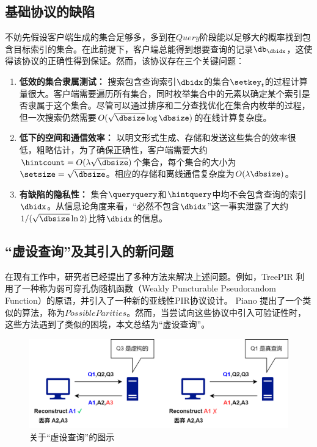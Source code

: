 \subsection{基础协议的缺陷}
不妨先假设客户端生成的集合足够多，多到在$Query$阶段能以足够大的概率找到包含目标索引的集合。在此前提下，客户端总能得到想要查询的记录$\db_\dbidx$，这使得该协议的正确性得到保证。然而，该协议存在三个关键问题：

\begin{enumerate}
\item \textbf{低效的集合隶属测试：} 搜索包含查询索引$\dbidx$的集合$\setkey_t$的过程计算量很大。客户端需要遍历所有集合，同时枚举集合中的元素以确定某个索引是否隶属于这个集合。尽管可以通过排序和二分查找优化在集合内枚举的过程，但一次搜索仍然需要$O(\sqrt{\dbsize}\log \dbsize)$的在线计算复杂度。
\item \textbf{低下的空间和通信效率：} 以明文形式生成、存储和发送这些集合的效率很低，粗略估计，为了确保正确性，客户端需要大约$\hintcount = O(\lambda\sqrt{\dbsize})$个集合，每个集合的大小为$\setsize = \sqrt{\dbsize}$。相应的存储和离线通信复杂度为$O(\lambda\dbsize)$。
\item \textbf{有缺陷的隐私性：} 集合$\queryquery$和$\hintquery$中均不会包含查询的索引$\dbidx$。从信息论角度来看，“必然不包含$\dbidx$”这一事实泄露了大约$1/(\sqrt{\dbsize}\ln 2)$比特$\dbidx$的信息。
\end{enumerate}

\subsection{“虚设查询”及其引入的新问题}
在现有工作中，研究者已经提出了多种方法来解决上述问题。例如，TreePIR \cite{C:LazPap23} 利用了一种称为弱可穿孔伪随机函数（Weakly Puncturable Pseudorandom Function）的原语，并引入了一种新的亚线性PIR协议设计。 Piano \cite{Piano} 提出了一个类似的算法，称为$PossibleParities$。然而，当尝试向这些协议中引入可验证性时，这些方法遇到了类似的困境，本文总结为“虚设查询”。

\begin{figure}
    \centering
    \includegraphics[width=1\linewidth]{figure/dummy.png}
    \caption{关于“虚设查询”的图示}
    \label{fig:dummy}
\end{figure}

